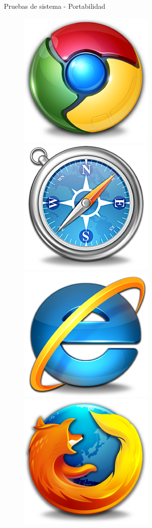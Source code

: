 \documentclass[spanish,xcolor=table,svgnames]{beamer}
\begin{document}
\begin{frame}{Pruebas de sistema - Portabilidad}
  \begin{figure}[]
\includegraphics[scale=0.15]{Chrome}
\includegraphics[scale=0.15]{Safari}
\includegraphics[scale=0.15]{IE}
\includegraphics[scale=0.15]{Firefox}

\end{figure}
\end{frame}
\end{document}
